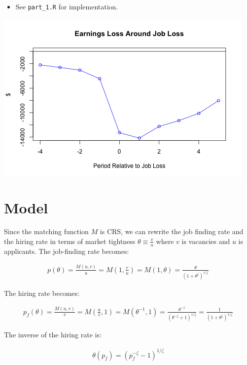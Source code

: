 \documentclass{article}
\begin{document}
\begin{itemize}
\begin{itemize}
\end{itemize}

\item See \texttt{part\_1.R} for implementation.

\end{itemize}

\includegraphics{part_1.png}

\pagebreak

\section{Model}

Since the matching function $M$ is CRS, we can rewrite the job finding rate and the hiring rate in terms of market tightness $\theta \equiv \frac{v}{u}$ where $v$ is vacancies and $u$ is applicants. The job-finding rate becomes:

\begin{align*}
p(\theta) = \frac{M(u, v)}{u} = M(1, \frac{v}{u}) = M(1, \theta) = \frac{\theta}{(1+\theta^\zeta)^{1/\zeta}}
\end{align*}

The hiring rate becomes:

\begin{align*}
p_f(\theta) = \frac{M(u, v)}{v} =M( \frac{u}{v}, 1) = M(\theta^{-1}, 1) = \frac{\theta^{-1}}{(\theta^{-\zeta}+ 1)^{1/\zeta}} = \frac{1}{(1+\theta^\zeta)^{1/\zeta}}
\end{align*}

The inverse of the hiring rate is:

\begin{align*}
\theta(p_f) = (p_f^{-\zeta} - 1)^{1/\zeta}
\end{align*}
\end{document}
